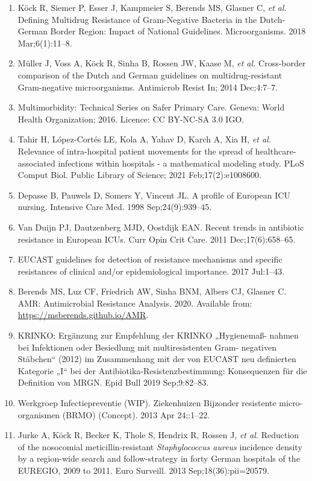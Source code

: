 \documentclass[
]{book}
\begin{document}
\begin{enumerate}
\item
  Köck R, Siemer P, Esser J, Kampmeier S, Berends MS, Glasner C, \emph{et al.} Defining Multidrug Resistance of Gram-Negative Bacteria in the Dutch-German Border Region: Impact of National Guidelines. Microorganisms. 2018 Mar;6(1):11--8.
\item
  Müller J, Voss A, Köck R, Sinha B, Rossen JW, Kaase M, \emph{et al.} Cross-border comparison of the Dutch and German guidelines on multidrug-resistant Gram-negative microorganisms. Antimicrob Resist In; 2014 Dec;4:7--7.
\item
  Multimorbidity: Technical Series on Safer Primary Care. Geneva: World Health Organization; 2016. Licence: CC BY-NC-SA 3.0 IGO.
\item
  Tahir H, López-Cortés LE, Kola A, Yahav D, Karch A, Xia H, \emph{et al.} Relevance of intra-hospital patient movements for the spread of healthcare-associated infections within hospitals - a mathematical modeling study. PLoS Comput Biol. Public Library of Science; 2021 Feb;17(2):e1008600.
\item
  Depasse B, Pauwels D, Somers Y, Vincent JL. A profile of European ICU nursing. Intensive Care Med. 1998 Sep;24(9):939--45.
\item
  Van Duijn PJ, Dautzenberg MJD, Oostdijk EAN. Recent trends in antibiotic resistance in European ICUs. Curr Opin Crit Care. 2011 Dec;17(6):658--65.
\item
  EUCAST guidelines for detection of resistance mechanisms and specific resistances of clinical and/or epidemiological importance. 2017 Jul:1--43.
\item
  Berends MS, Luz CF, Friedrich AW, Sinha BNM, Albers CJ, Glasner C. AMR: Antimicrobial Resistance Analysis. 2020. Available from: \url{https://msberends.github.io/AMR}.
\item
  KRINKO: Ergänzung zur Empfehlung der KRINKO „Hygienemaß- nahmen bei Infektionen oder Besiedlung mit multiresistenten Gram- negativen Stäbchen`` (2012) im Zusammenhang mit der von EUCAST neu definierten Kategorie „I`` bei der Antibiotika-Resistenzbestimmung: Konsequenzen für die Definition von MRGN. Epid Bull 2019 Sep;9:82--83.
\item
  Werkgroep Infectiepreventie (WIP). Ziekenhuizen Bijzonder resistente micro-organismen (BRMO) (Concept). 2013 Apr 24;:1--22.
\item
  Jurke A, Köck R, Becker K, Thole S, Hendrix R, Rossen J, \emph{et al.} Reduction of the nosocomial meticillin-resistant \emph{Staphylococcus aureus} incidence density by a region-wide search and follow-strategy in forty German hospitals of the EUREGIO, 2009 to 2011. Euro Surveill. 2013 Sep;18(36):pii=20579.

\end{enumerate}
\end{document}
